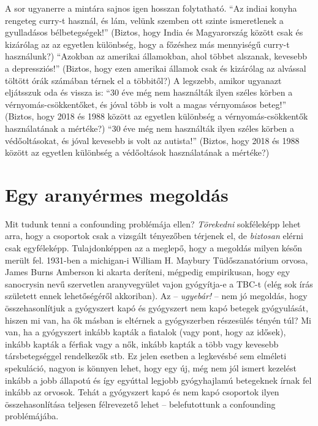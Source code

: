 \documentclass[magyar,]{book}
\begin{document}
A sor ugyanerre a mintára sajnos igen hosszan folytatható. \enquote{Az indiai konyha rengeteg curry-t használ, és lám, velünk szemben ott szinte ismeretlenek a gyulladásos bélbetegségek!} (Biztos, hogy India és Magyarország között csak és kizárólag az az egyetlen különbség, hogy a főzéshez más mennyiségű curry-t használunk?) \enquote{Azokban az amerikai államokban, ahol többet alszanak, kevesebb a depressziós!} (Biztos, hogy ezen amerikai államok csak és kizárólag az alvással töltött órák számában térnek el a többitől?) A legszebb, amikor ugyanazt eljátsszuk oda és vissza is: \enquote{30 éve még nem használták ilyen széles körben a vérnyomás-csökkentőket, és jóval több is volt a magas vérnyomásos beteg!} (Biztos, hogy 2018 és 1988 között az egyetlen különbség a vérnyomás-csökkentők használatának a mértéke?) \enquote{30 éve még nem használták ilyen széles körben a védőoltásokat, és jóval kevesebb is volt az autista!} (Biztos, hogy 2018 és 1988 között az egyetlen különbség a védőoltások használatának a mértéke?)

\hypertarget{egy-aranyuxe9rmes-megolduxe1s}{%
\section{Egy aranyérmes megoldás}\label{egy-aranyuxe9rmes-megolduxe1s}}

Mit tudunk tenni a confounding problémája ellen? \emph{Törekedni} sokféleképp lehet arra, hogy a csoportok csak a vizsgált tényezőben térjenek el, de \emph{biztosan} elérni csak egyféleképp. Tulajdonképpen az a meglepő, hogy a megoldás milyen későn merült fel. 1931-ben a michigan-i William H. Maybury Tüdőszanatórium orvosa, James Burns Amberson ki akarta deríteni, mégpedig empirikusan, hogy egy sanocrysin nevű szervetlen aranyvegyület vajon gyógyítja-e a TBC-t (elég sok írás született ennek lehetőségéről akkoriban). Az -- \emph{ugyebár!} -- nem jó megoldás, hogy összehasonlítjuk a gyógyszert kapó és gyógyszert nem kapó betegek gyógyulását, hiszen mi van, ha ők másban is eltérnek a gyógyszerben részesülés tényén túl? Mi van, ha a gyógyszert inkább kapták a fiatalok (vagy pont, hogy az idősek), inkább kapták a férfiak vagy a nők, inkább kapták a több vagy kevesebb társbetegséggel rendelkezők stb. Ez jelen esetben a legkevésbé sem elméleti spekuláció, nagyon is könnyen lehet, hogy egy új, még nem jól ismert kezelést inkább a jobb állapotú és így egyúttal legjobb gyógyhajlamú betegeknek írnak fel inkább az orvosok. Tehát a gyógyszert kapó és nem kapó csoportok ilyen összehasonlítása teljesen félrevezető lehet -- belefutottunk a confounding problémájába.
\end{document}
